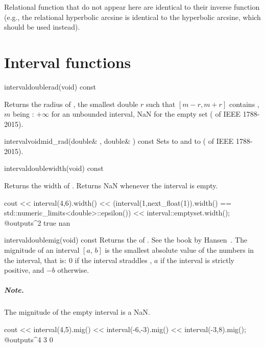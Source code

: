\documentclass{manual}
\newcommand{\itv}[2]{\ensuremath{[#1,\,#2]}}
\newcommand{\roundUp}[1]{\ensuremath{\uparrow#1\uparrow}}
\begin{document}
Relational function that do not appear here are identical to their inverse function (e.g., the
relational hyperbolic arcsine is identical to the hyperbolic arcsine, which should be used instead).


\chapter{Interval functions}

\begin{defmethod}{interval}{double}{rad}{(void) const}
  \begin{operation}
    \op{$\code{rad}(\itv{a}{b})=\min\{r\mid [m-r,m+r]\supseteq\itv{a}{b}\}$}
  \end{operation}
Returns the radius of , the smallest double $r$ such that
$[m-r,m+r]$ contains , $m$ being : $+\infty$
for an unbounded interval, NaN for the empty set ( of IEEE 1788-2015).
\end{defmethod}

\begin{defmethod}{interval}{void}{mid\_rad}{(double\& , double\& ) const}
Sets  to  and  to 
( of IEEE 1788-2015).
\end{defmethod}

\begin{defmethod}{interval}{double}{width}{(void) const}
  \begin{operation}
    \op{$\code{width}(\itv{a}{b})=\roundUp{b-a}$}
  \end{operation}
Returns the width of . Returns NaN whenever the interval is empty.
\begin{example}
cout << interval(4,6).width()
     << (interval(1,next_float(1)).width()
         == std::numeric_limits<double>::epsilon())
     << interval::emptyset.width();
@outputs^2 true nan~
\end{example}
\end{defmethod}

\begin{defmethod}{interval}{double}{mig}{(void) const}
  Returns the  of . See the book by
  Hansen~. The mignitude of an
  interval \itv{a}{b} is the smallest absolute value of the numbers in
  the interval, that is: $0$ if the interval straddles , $a$
  if the interval is strictly positive, and $-b$ otherwise.

\paragraph{Note.} The mignitude of the empty interval is a NaN.
\begin{example}
cout << interval(4,5).mig()
     << interval(-6,-3).mig()
     << interval(-3,8).mig();
@outputs^4 3 0~
\end{example}
\end{defmethod}
\end{document}
